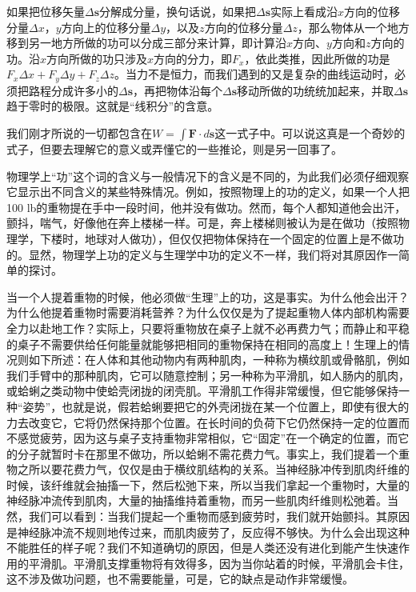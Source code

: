 如果把位移矢量$\Delta \boldsymbol{s}$分解成分量，换句话说，如果把$\Delta \boldsymbol{s}$实际上看成沿$x$方向的位移分量$\Delta x$，$y$方向上的位移分量$\Delta y$，以及$z$方向的位移分量$\Delta z$，那么物体从一个地方移到另一地方所做的功可以分成三部分来计算，即计算沿$x$方向、$y$方向和$z$方向的功。沿$x$方向所做的功只涉及$x$方向的分力，即$F_x$，依此类推，因此所做的功是$F_x \Delta x+F_y \Delta y+F_z \Delta z$。当力不是恒力，而我们遇到的又是复杂的曲线运动时，必须把路程分成许多小的$\Delta \boldsymbol{s}$，再把物体沿每个$\Delta \boldsymbol{s}$移动所做的功统统加起来，并取$\Delta \boldsymbol{s}$趋于零时的极限。这就是“线积分”的含意。

我们刚才所说的一切都包含在$W=\int \boldsymbol{F} \cdot d\boldsymbol{s}$这一式子中。可以说这真是一个奇妙的式子，但要去理解它的意义或弄懂它的一些推论，则是另一回事了。

物理学上“功”这个词的含义与一般情况下的含义是不同的，为此我们必须仔细观察它显示出不同含义的某些特殊情况。例如，按照物理上的功的定义，如果一个人把100 lb的重物提在手中一段时间，他并没有做功。然而，每个人都知道他会出汗，颤抖，喘气，好像他在奔上楼梯一样。可是，奔上楼梯则被认为是在做功（按照物理学，下楼时，地球对人做功），但仅仅把物体保持在一个固定的位置上是不做功的。显然，物理学上功的定义与生理学中功的定义不一样，我们将对其原因作一简单的探讨。

当一个人提着重物的时候，他必须做“生理”上的功，这是事实。为什么他会出汗？为什么他提着重物时需要消耗营养？为什么仅仅是为了提起重物人体内部机构需要全力以赴地工作？实际上，只要将重物放在桌子上就不必再费力气；而静止和平稳的桌子不需要供给任何能量就能够把相同的重物保持在相同的高度上！生理上的情况则如下所述：在人体和其他动物内有两种肌肉，一种称为横纹肌或骨骼肌，例如我们手臂中的那种肌肉，它可以随意控制；另一种称为平滑肌，如人肠内的肌肉，或蛤蜊之类动物中使蛤壳闭拢的闭壳肌。平滑肌工作得非常缓慢，但它能够保持一种“姿势”，也就是说，假若蛤蜊要把它的外壳闭拢在某一个位置上，即使有很大的力去改变它，它将仍然保持那个位置。在长时间的负荷下它仍然保持一定的位置而不感觉疲劳，因为这与桌子支持重物非常相似，它“固定”在一个确定的位置，而它的分子就暂时卡在那里不做功，所以蛤蜊不需花费力气。事实上，我们提着一个重物之所以要花费力气，仅仅是由于横纹肌结构的关系。当神经脉冲传到肌肉纤维的时候，该纤维就会抽搐一下，然后松弛下来，所以当我们拿起一个重物时，大量的神经脉冲流传到肌肉，大量的抽搐维持着重物，而另一些肌肉纤维则松弛着。当然，我们可以看到：当我们提起一个重物而感到疲劳时，我们就开始颤抖。其原因是神经脉冲流不规则地传过来，而肌肉疲劳了，反应得不够快。为什么会出现这种不能胜任的样子呢？我们不知道确切的原因，但是人类还没有进化到能产生快速作用的平滑肌。平滑肌支撑重物将有效得多，因为当你站着的时候，平滑肌会卡住，这不涉及做功问题，也不需要能量，可是，它的缺点是动作非常缓慢。

